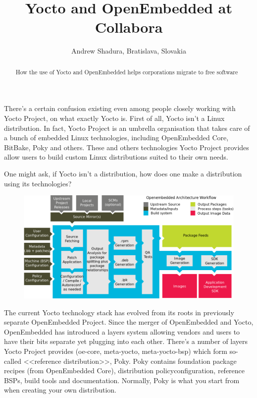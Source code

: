 \documentclass[10pt, a5paper]{article}
\begin{document}
\title{Yocto and OpenEmbedded at Collabora}
\author{Andrew Shadura, Bratislava, Slovakia}
\maketitle
\begin{abstract}
How the use of Yocto and OpenEmbedded helps corporations migrate to free software
\end{abstract}

There's a certain confusion existing even among people closely \linebreak working with Yocto Project, on what exactly Yocto is. First of all, Yocto isn't a Linux distribution. In fact, Yocto Project is an umbrella organisation that takes care of a bunch of embedded Linux technologies, including OpenEmbedded Core, BitBake, Poky and others. These and others technologies Yocto Project provides allow users to build custom Linux distributions suited to their own needs.

One might ask, if Yocto isn't a distribution, how does one make a distribution using its technologies?

\begin{figure}[h!]
  \centering
  \includegraphics[height=5.5cm]{w_07_2016_Shadura1.png}
\end{figure}

The current Yocto technology stack has evolved from its roots in previously separate OpenEmbedded Project. Since the merger \linebreak of OpenEmbedded and Yocto, OpenEmbedded has introduced a layers system allowing vendors and users to have their bits separate yet \linebreak plugging into each other. There's a number of layers Yocto Project provides ({\ttfamily oe-core, meta-yocto, meta-yocto-bsp}) which form so-called \linebreak <<reference distribution>>, Poky. Poky contains foundation package \linebreak recipes (from OpenEmbedded Core), distribution policy\linebreak configuration, reference BSPs, build tools and documentation. Normally, Poky is what you start from when creating your own distribution.
\end{document}
